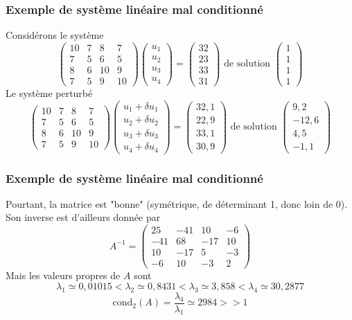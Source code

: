\documentclass{beamer}
\begin{document}
\begin{frame}
\frametitle{Exemple de système linéaire mal conditionné}
Considérons le système
\[\left(\begin{array}{cccc}
10&7&8&7\\
7&5&6&5\\
8&6&10&9 \\
7&5&9&10
\end{array}\right) \left(\begin{array}{c}
u_1\\
u_2\\
u_3 \\
u_4
\end{array}\right) =\left(\begin{array}{c}
32\\
23\\
33 \\
31
\end{array}\right)  \mbox{ de solution }\left(\begin{array}{c}
1\\
1\\
1 \\
1
\end{array}\right) \]
Le système perturbé
\[\left(\begin{array}{cccc}
10&7&8&7\\
7&5&6&5\\
8&6&10&9 \\
7&5&9&10
\end{array}\right) \left(\begin{array}{c}
u_1+\delta u_1\\
u_2+\delta u_2\\
u_3+\delta u_3 \\
u_4+\delta u_4
\end{array}\right) =\left(\begin{array}{c}
32,1\\
22,9\\
33,1 \\
30,9
\end{array}\right)  \mbox{ de solution }\left(\begin{array}{c}
9,2\\
-12,6\\
4,5 \\
-1,1
\end{array}\right) \]
\end{frame}
\begin{frame}
\frametitle{Exemple de système linéaire mal conditionné}
Pourtant, la matrice est "bonne" (symétrique, de déterminant 1, donc loin de 0). Son inverse est d'ailleurs donnée par
\[A^{-1}=\left(\begin{array}{cccc}
25&-41&10&-6\\
-41&68&-17&10\\
10&-17&5&-3\\
-6&10&-3&2
\end{array}\right) \]
Mais les valeurs propres de $A$ sont
\[\lambda_1 \simeq 0,01015<\lambda_2 \simeq 0,8431<\lambda_3 \simeq 3,858<\lambda_4 \simeq 30,2877\]
\[\mbox{cond}_2(A)=\frac{\lambda_4}{\lambda_1}\simeq 2984 >>1\]
\end{frame}
\end{document}
